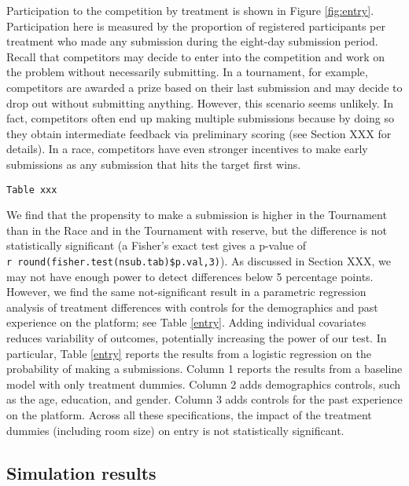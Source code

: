 \documentclass[12pt, titlepage, draft]{article} \usepackage[utf8]{inputenc}                           \usepackage[english]{babel}                           \usepackage{amsmath,amssymb,amsfonts}                 \usepackage{xcolor,tikz,graphicx,subfig}              \usepackage{rotating,multirow,array,dcolumn,booktabs} \usepackage{natbib}                                   
\begin{document}
Participation to the competition by treatment is shown in Figure
\ref{fig:entry}. Participation here is measured by the proportion of
registered participants per treatment who made any submission during the
eight-day submission period. Recall that competitors may decide to enter
into the competition and work on the problem without necessarily
submitting. In a tournament, for example, competitors are awarded a
prize based on their last submission and may decide to drop out without
submitting anything. However, this scenario seems unlikely. In fact,
competitors often end up making multiple submissions because by doing so
they obtain intermediate feedback via preliminary scoring (see Section
XXX for details). In a race, competitors have even stronger incentives
to make early submissions as any submission that hits the target first
wins.

\begin{verbatim}
Table xxx
\end{verbatim}

We find that the propensity to make a submission is higher in the
Tournament than in the Race and in the Tournament with reserve, but the
difference is not statistically significant (a Fisher's exact test gives
a p-value of \texttt{r\ round(fisher.test(nsub.tab)\$p.val,3)}). As
discussed in Section XXX, we may not have enough power to detect
differences below 5 percentage points. However, we find the same
not-significant result in a parametric regression analysis of treatment
differences with controls for the demographics and past experience on
the platform; see Table \ref{entry}. Adding individual covariates
reduces variability of outcomes, potentially increasing the power of our
test. In particular, Table \ref{entry} reports the results from a
logistic regression on the probability of making a submissions. Column 1
reports the results from a baseline model with only treatment dummies.
Column 2 adds demographics controls, such as the age, education, and
gender. Column 3 adds controls for the past experience on the platform.
Across all these specifications, the impact of the treatment dummies
(including room size) on entry is not statistically significant.

\subsection{Simulation results}\label{simulation-results}
 
   
\newpage
\singlespacing

\end{document}
